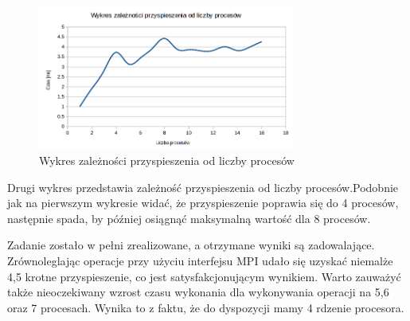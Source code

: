 \documentclass[a4paper,12pt]{article}
\begin{document}
\begin{figure}[H]
	\centering
  \includegraphics[width=0.75\textwidth]{dane/wykres2.png}
  \caption{Wykres zależności przyspieszenia od liczby procesów}
\end{figure}
 
Drugi wykres przedstawia zależność przyspieszenia od liczby procesów.Podobnie jak na pierwszym wykresie widać, że przyspieszenie poprawia się do 4 procesów, następnie spada, by później osiągnąć maksymalną wartość dla 8 procesów. \newline

Zadanie zostało w pełni zrealizowane, a otrzymane wyniki są zadowalające.
Zrównoleglając operacje przy użyciu interfejsu MPI udało się uzyskać niemalże 4,5 krotne przyspieszenie, co jest satysfakcjonującym wynikiem. Warto zauważyć także nieoczekiwany wzrost czasu wykonania dla wykonywania operacji na 5,6 oraz 7 procesach. Wynika to z faktu, że do dyspozycji mamy 4 rdzenie procesora.
\end{document}
